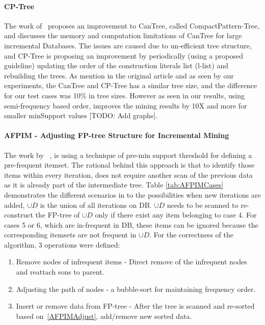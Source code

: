 \paragraph{CP-Tree}
\label{par:cptree}
	The work of~\cite{tanbeer2009efficient} proposes an improvement to CanTree, called CompactPattern-Tree, and discusses the memory and computation limitations of CanTree for large incremental Databases. The issues are caused due to un-efficient tree structure, and CP-Tree is proposing an improvement by periodically (using a proposed guideline) updating the order of the construction literals list (l-list) and rebuilding the trees. As mention in the original article and as seen by our experiments, the CanTree and CP-Tree has a similar tree size, and the difference for our test cases was 10\% in tree sizes. However as seen in our results, using semi-frequency based order, improves the mining results by 10X and more for smaller minSupport values [TODO: Add graphs].

\paragraph{AFPIM - Adjusting FP-tree Structure for Incremental Mining }
\label{par:AFPIM}
  The work by ~\cite{kohefficient}, is using a technique of pre-min support threshold for defining a pre-frequent itemset. The rational behind this approach is that to identify those items within every iteration, does not require another scan of the previous data as it is already part of the intermediate tree.  Table \ref{tab:AFPIMCases} demonstrates the different scenarios in to the possibilities when new iterations are added, $ \cup D $ is the union of all iterations on DB. $ \cup D $ needs to be scanned to re-construct the FP-tree of
$ \cup D $  only if there exist any item belonging to case 4. For cases 5 or 6, which are in-frequent in DB, these items can be ignored because the corresponding itemsets are not frequent in $ \cup D $.  For the correctness of the algorithm, 3 operations were defined:

\begin{enumerate}[label=\textbf{AFPIM.\arabic*}]
\item \label{AFPIMRemove} Remove nodes of infrequent items - Direct remove of the infrequent nodes and reattach sons to parent.
\item \label{AFPIMAdjust} Adjusting the path of nodes - a bubble-sort for maintaining frequency order.
\item Insert or remove data from FP-tree - After the tree is scanned and re-sorted based on~\ref{AFPIMAdjust}, add/remove new sorted data.
\end{enumerate}


